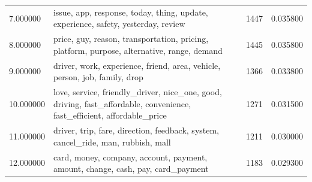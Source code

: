 \documentclass[12pt]{article}
\begin{document}
\begin{table}[h]
\begin{tabular}{|p{2cm}|p{8cm}|p{1cm}|p{2cm}|}
7.000000                                                                  & issue, app, response, today, thing, update, experience, safety, yesterday, review                                            & 1447                    & 0.035800                  \\
8.000000                                                                  & price, guy, reason, transportation, pricing, platform, purpose, alternative, range, demand                                   & 1445                    & 0.035800                  \\
9.000000                                                                  & driver, work, experience, friend, area, vehicle, person, job, family, drop                                                   & 1366                    & 0.033800                  \\
10.000000                                                                 & love, service, friendly\_driver, nice\_one, good, driving, fast\_affordable, convenience, fast\_efficient, affordable\_price & 1271                    & 0.031500                  \\
11.000000                                                                 & driver, trip, fare, direction, feedback, system, cancel\_ride, man, rubbish, mall                                            & 1211                    & 0.030000                  \\
12.000000                                                                 & card, money, company, account, payment, amount, change, cash, pay, card\_payment                                             & 1183                    & 0.029300                  \\
\hline
\end{tabular}
\end{table}
\end{document}
